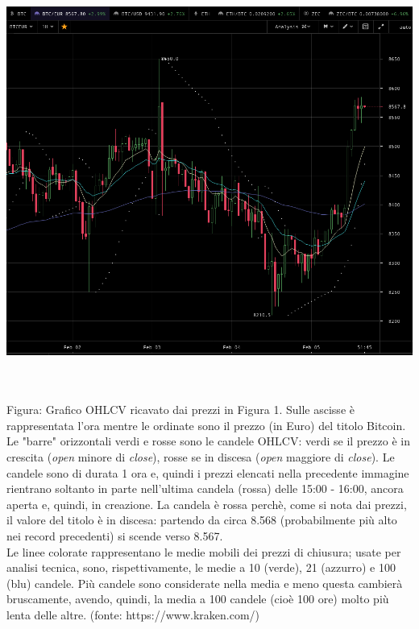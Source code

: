 \documentclass[a4paper,12pt]{report}
\begin{document}
\begin{fig}
\begin{center}
		\includegraphics[width=\linewidth]{kraken_ohlcv}
\end{center}
		\caption{\\~\\Figura: Grafico OHLCV ricavato dai prezzi in Figura 1. Sulle ascisse è rappresentata l'ora mentre le ordinate sono il prezzo (in Euro) del titolo Bitcoin. Le "barre" orizzontali verdi e rosse sono le candele OHLCV: verdi se il prezzo è in crescita (\textit{open} minore di \textit{close}), rosse se in discesa (\textit{open} maggiore di \textit{close}). Le candele sono di durata 1 ora e, quindi i prezzi elencati nella precedente immagine rientrano soltanto in parte nell'ultima candela (rossa) delle 15:00 - 16:00, ancora aperta e, quindi, in creazione. La candela è rossa perchè, come si nota dai prezzi, il valore del titolo  è in discesa: partendo da circa 8.568 (probabilmente più alto nei record precedenti) si scende verso 8.567.\\
			Le linee colorate rappresentano le medie mobili dei prezzi di chiusura; usate per analisi tecnica, sono, rispettivamente, le medie a 10 (verde), 21 (azzurro) e 100 (blu) candele. Più candele sono considerate nella media e meno questa cambierà bruscamente, avendo, quindi, la media a 100 candele (cioè 100 ore) molto più lenta delle altre. (fonte: https://www.kraken.com/)}
\end{fig}
\end{document}
